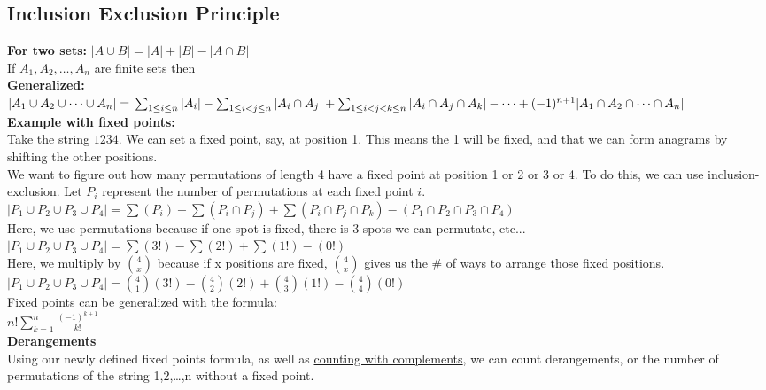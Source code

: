 \documentclass{article}
\begin{document}
\begin{spacing}{1.5}
\subsection{Inclusion Exclusion Principle}
\label{sec:inclusionexclusion}
\textbf{For two sets:} $|A \cup B| = |A| + |B| - |A \cap B|$\\
If $A_1, A_2, \dots, A_n$ are finite sets then\\
\textbf{Generalized:}\\ $|A_1 \cup A_2 \cup \dots \cup A_n| =\\ \sum_{1 \leq i \leq n} |A_i| - \sum_{1 \leq i < j \leq n}|A_i \cap A_j| + \sum_{1 \leq i < j < k \leq n}|A_i \cap A_j \cap A_k| - \dots + (-1)^{n+1}|A_1 \cap A_2 \cap \dots \cap A_n|$\\
\textbf{Example with fixed points:}\\
Take the string $1234$. We can set a fixed point, say, at position 1. This means the 1 will be fixed, and that we can form anagrams by shifting the other positions.\\
We want to figure out how many permutations of length 4 have a fixed point at position 1 or 2 or 3 or 4. To do this, we can use inclusion-exclusion. Let $P_i$ represent the number of permutations at each fixed point $i$.\\
$|P_1 \cup P_2 \cup P_3 \cup P_4| = \sum(P_i) - \sum(P_i \cap P_j) + \sum(P_i \cap P_j \cap P_k) - (P_1 \cap P_2 \cap P_3 \cap P_4)$\\
Here, we use permutations because if one spot is fixed, there is 3 spots we can permutate, etc...
$|P_1 \cup P_2 \cup P_3 \cup P_4| = \sum(3!) - \sum(2!) + \sum(1!) - (0!)$\\
Here, we multiply by $\binom{4}{x}$ because if x positions are fixed, $\binom{4}{x}$ gives us the \# of ways to arrange those fixed positions.\\
$|P_1 \cup P_2 \cup P_3 \cup P_4| = \binom{4}{1}(3!) - \binom{4}{2}(2!) + \binom{4}{3}(1!) - \binom{4}{4}(0!)$\\
Fixed points can be generalized with the formula: \\ $n!\sum_{k=1}^n\frac{(-1)^{k+1}}{k!}$\\
\textbf{Derangements}\\
Using our newly defined fixed points formula, as well as \hyperref[sec:complement]{counting with complements}, we can count derangements, or the number of permutations of the string {1,2,\dots,n} without a fixed point.\\


\end{spacing}
\end{document}
